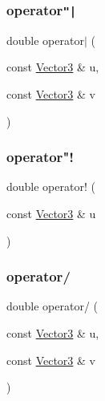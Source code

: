 \mbox{\label{class_vector3_ac0d7df6bee7a105ace4ec138bff8a262}} 
\subsubsection{\texorpdfstring{operator\texttt{"|}}{operator|}}
{\footnotesize\ttfamily double operator$\vert$ (\begin{DoxyParamCaption}\item[{const \mbox{\hyperlink{class_vector3}{Vector3}} \&}]{u,  }\item[{const \mbox{\hyperlink{class_vector3}{Vector3}} \&}]{v }\end{DoxyParamCaption})\hspace{0.3cm}{\ttfamily [friend]}}

\mbox{\label{class_vector3_ae2d5ffacf6098c4c2883e54131fa70c2}} 
\subsubsection{\texorpdfstring{operator"!}{operator!}}
{\footnotesize\ttfamily double operator! (\begin{DoxyParamCaption}\item[{const \mbox{\hyperlink{class_vector3}{Vector3}} \&}]{u }\end{DoxyParamCaption})\hspace{0.3cm}{\ttfamily [friend]}}

\mbox{\label{class_vector3_a87668fe6d96f1826fb2721883d194ad3}} 
\subsubsection{\texorpdfstring{operator/}{operator/}\hspace{0.1cm}{\footnotesize\ttfamily [2/2]}}
{\footnotesize\ttfamily double operator/ (\begin{DoxyParamCaption}\item[{const \mbox{\hyperlink{class_vector3}{Vector3}} \&}]{u,  }\item[{const \mbox{\hyperlink{class_vector3}{Vector3}} \&}]{v }\end{DoxyParamCaption})\hspace{0.3cm}{\ttfamily [friend]}}

